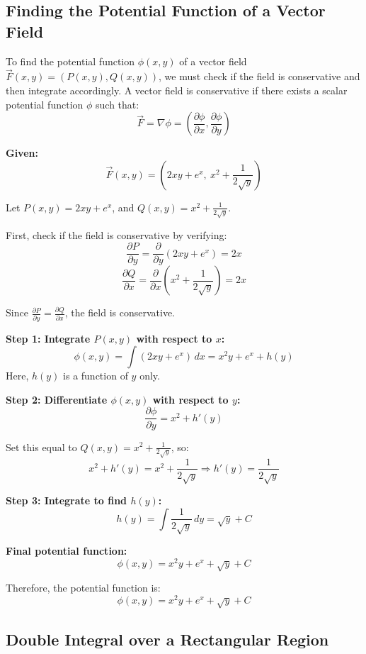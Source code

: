 \subsection{Finding the Potential Function of a Vector Field}

To find the potential function \( \phi(x, y) \) of a vector field \( \vec{F}(x, y) = (P(x, y), Q(x, y)) \), we must check if the field is conservative and then integrate accordingly. A vector field is conservative if there exists a scalar potential function \( \phi \) such that:
\[
\vec{F} = \nabla \phi = \left( \frac{\partial \phi}{\partial x}, \frac{\partial \phi}{\partial y} \right)
\]

\textbf{Given:}
\[
\vec{F}(x, y) = \left(2xy + e^x,\ x^2 + \frac{1}{2\sqrt{y}}\right)
\]

Let \( P(x, y) = 2xy + e^x \), and \( Q(x, y) = x^2 + \frac{1}{2\sqrt{y}} \).

First, check if the field is conservative by verifying:
\[
\frac{\partial P}{\partial y} = \frac{\partial}{\partial y}(2xy + e^x) = 2x
\]
\[
\frac{\partial Q}{\partial x} = \frac{\partial}{\partial x}\left(x^2 + \frac{1}{2\sqrt{y}}\right) = 2x
\]

Since \( \frac{\partial P}{\partial y} = \frac{\partial Q}{\partial x} \), the field is conservative.

\textbf{Step 1: Integrate \( P(x, y) \) with respect to \( x \):}
\[
\phi(x, y) = \int (2xy + e^x)\,dx = x^2y + e^x + h(y)
\]
Here, \( h(y) \) is a function of \( y \) only.

\textbf{Step 2: Differentiate \( \phi(x, y) \) with respect to \( y \):}
\[
\frac{\partial \phi}{\partial y} = x^2 + h'(y)
\]

Set this equal to \( Q(x, y) = x^2 + \frac{1}{2\sqrt{y}} \), so:
\[
x^2 + h'(y) = x^2 + \frac{1}{2\sqrt{y}} \Rightarrow h'(y) = \frac{1}{2\sqrt{y}}
\]

\textbf{Step 3: Integrate to find \( h(y) \):}
\[
h(y) = \int \frac{1}{2\sqrt{y}}\,dy = \sqrt{y} + C
\]

\textbf{Final potential function:}
\[
\phi(x, y) = x^2y + e^x + \sqrt{y} + C
\]

Therefore, the potential function is:
\[
\boxed{\phi(x, y) = x^2y + e^x + \sqrt{y} + C}
\]


\subsection{Double Integral over a Rectangular Region}

